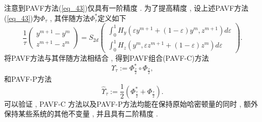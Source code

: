注意到PAVF方法(\ref{eq_43})仅具有一阶精度\cite{caiPartitionedAveragedVector2018} . 为了提高精度 , 
设上述PAVF方法(\ref{eq_43})为$\Phi_{\tau}$ , 其伴随方法$\Phi_{\tau}^{*}$定义如下
\begin{equation}
\frac{1}{\tau}\left(\begin{array}{c}
y^{m+1}-y^{m} \\
z^{m+1}-z^{m}
\end{array}\right)=S_{2 d}\left(\begin{array}{c}
\int_{0}^{1} H_{y}\left(\varepsilon y^{m+1}+(1-\varepsilon) y^{m} , z^{m+1}\right) d \varepsilon \\
\int_{0}^{1} H_{z}\left(y^{m} , \varepsilon z^{m+1}+(1-\varepsilon) z^{m}\right) d \varepsilon
\end{array}\right) . 
\label{eq_44}\end{equation}
将PAVF方法与其伴随方法相结合 , 得到PAVF组合(PAVF-C)方法
\begin{equation}
\Upsilon_{\tau}:=\Phi_{\frac{\tau}{2}}^{*} \circ \Phi_{\frac{\tau}{2}} , 
\label{eq_45}\end{equation}
和PAVF-P方法
\begin{equation}
\hat{\Upsilon}_{\tau}:=\frac{1}{2}\left(\Phi_{\frac{\tau}{2}}^{*}+\Phi_{\frac{\tau}{2}}\right) . 
\label{eq_46}\end{equation}
可以验证 , PAVF-C 方法以及PAVF-P方法均能在保持原始哈密顿量的同时 , 额外保持某些系统的其他不变量 , 并且具有二阶精度\cite{caiPartitionedAveragedVector2018} . 
